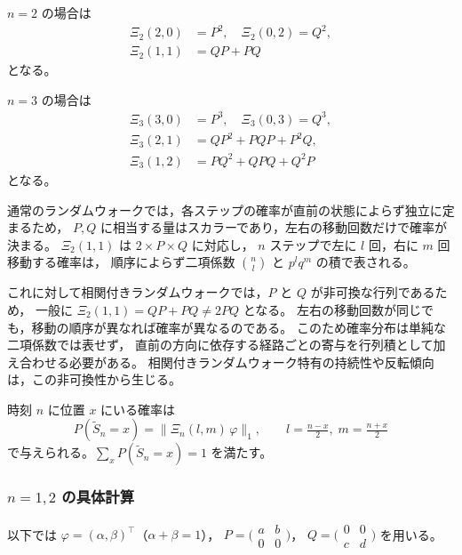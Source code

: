 \documentclass[a4j,dvipdfmx]{jsarticle}
\theoremstyle{plainnote}
\begin{document}
$n = 2$ の場合は
\begin{align*}
  \Xi_2(2,0) &= P^2, \quad \Xi_2(0,2) = Q^2, \\
  \Xi_2(1,1) &= QP + PQ
\end{align*}
となる。

$n = 3$ の場合は
\begin{align*}
  \Xi_3(3,0) &= P^3, \quad \Xi_3(0,3) = Q^3, \\
  \Xi_3(2,1) &= QP^2 + PQP + P^2Q, \\
  \Xi_3(1,2) &= PQ^2 + QPQ + Q^2P
\end{align*}
となる。

通常のランダムウォークでは，各ステップの確率が直前の状態によらず独立に定まるため，
$P, Q$ に相当する量はスカラーであり，左右の移動回数だけで確率が決まる。
$\Xi_2(1,1)$ は $2 \times P \times Q$ に対応し，
$n$ ステップで左に $l$ 回，右に $m$ 回移動する確率は，
順序によらず二項係数 $\binom{n}{l}$ と $p^l q^m$ の積で表される。

これに対して相関付きランダムウォークでは，$P$ と $Q$ が非可換な行列であるため，
一般に $\Xi_2(1,1) = QP + PQ \neq 2PQ$ となる。
左右の移動回数が同じでも，移動の順序が異なれば確率が異なるのである。
このため確率分布は単純な二項係数では表せず，
直前の方向に依存する経路ごとの寄与を行列積として加え合わせる必要がある。
相関付きランダムウォーク特有の持続性や反転傾向は，この非可換性から生じる。

時刻 $n$ に位置 $x$ にいる確率は
\begin{equation}
  P(\tilde{S}_n = x) = \|\Xi_n(l,m)\,\varphi\|_1,
  \qquad l = \tfrac{n-x}{2},\; m = \tfrac{n+x}{2}
  \label{eq:crw_Xi}
\end{equation}
で与えられる。$\displaystyle\sum_{x} P(\tilde{S}_n = x) = 1$ を満たす。

\subsubsection*{$n = 1, 2$ の具体計算}

以下では $\varphi = (\alpha, \beta)^\top$（$\alpha + \beta = 1$），
$P = \bigl(\begin{smallmatrix}a&b\\0&0\end{smallmatrix}\bigr)$，
$Q = \bigl(\begin{smallmatrix}0&0\\c&d\end{smallmatrix}\bigr)$ を用いる。
\end{document}
